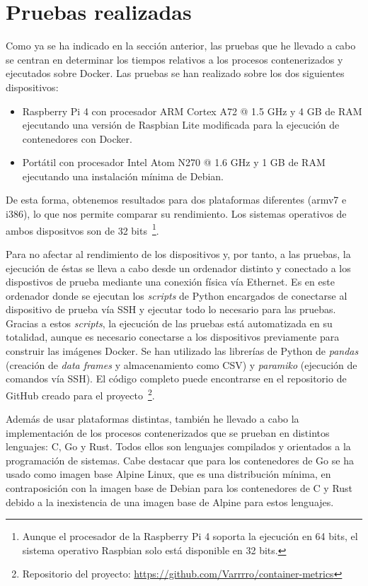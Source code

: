 \section{Pruebas realizadas}

Como ya se ha indicado en la sección anterior, las pruebas que he llevado a cabo
se centran en determinar los tiempos relativos a los procesos contenerizados y
ejecutados sobre Docker. Las pruebas se han realizado sobre los dos siguientes
dispositivos:

\begin{itemize}
      \item Raspberry Pi 4 con procesador ARM Cortex A72 @ 1.5 GHz y 4 GB de RAM
            ejecutando una versión de Raspbian Lite modificada para la ejecución de
            contenedores con Docker.
      \item Portátil con procesador Intel Atom N270 @ 1.6 GHz y 1 GB de RAM
            ejecutando una instalación mínima de Debian.
\end{itemize}

De esta forma, obtenemos resultados para dos plataformas diferentes (armv7 e
i386), lo que nos permite comparar su rendimiento. Los sistemas operativos de
ambos dispositvos son de 32 bits~\footnote{Aunque el procesador de la Raspberry
      Pi 4 soporta la ejecución en 64 bits, el sistema operativo Raspbian solo está
      disponible en 32 bits.}.

Para no afectar al rendimiento de los dispositivos y, por tanto, a las pruebas,
la ejecución de éstas se lleva a cabo desde un ordenador distinto y conectado a
los dispostivos de prueba mediante una conexión física vía Ethernet. Es en este
ordenador donde se ejecutan los \textit{scripts} de Python encargados de
conectarse al dispositivo de prueba vía SSH y ejecutar todo lo necesario para
las pruebas. Gracias a estos \textit{scripts}, la ejecución de las pruebas está
automatizada en su totalidad, aunque es necesario conectarse a los dispositivos
previamente para construir las imágenes Docker. Se han utilizado las librerías
de Python de \textit{pandas} (creación de \textit{data frames} y almacenamiento
como CSV) y \textit{paramiko} (ejecución de comandos vía SSH). El código
completo puede encontrarse en el repositorio de GitHub creado para el
proyecto~\footnote{Repositorio del proyecto:
      \url{https://github.com/Varrrro/container-metrics}}.

Además de usar plataformas distintas, también he llevado a cabo la
implementación de los procesos contenerizados que se prueban en distintos
lenguajes: C, Go y Rust. Todos ellos son lenguajes compilados y orientados a la
programación de sistemas. Cabe destacar que para los contenedores de Go se ha
usado como imagen base Alpine Linux, que es una distribución mínima, en
contraposición con la imagen base de Debian para los contenedores de C y Rust
debido a la inexistencia de una imagen base de Alpine para estos lenguajes.


